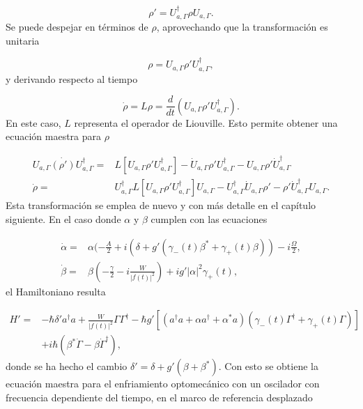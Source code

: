 \documentclass[10pt,a4paper]{report}
\begin{document}
\begin{equation}
\rho' = U_{a,\Gamma}^\dagger \rho U_{a,\Gamma}.
\end{equation} Se puede despejar en términos de $\rho$, aprovechando que la transformación es unitaria

\begin{equation}
\rho = U_{a,\Gamma} \rho' U_{a,\Gamma}^\dagger,
\end{equation} y derivando respecto al tiempo

\begin{equation}
\dot{\rho} = L\rho = \frac{d}{dt}(U_{a,\Gamma} \rho' U_{a,\Gamma}^\dagger).
\end{equation} En este caso, $L$ representa el operador de Liouville. Esto permite obtener una ecuación maestra para $\rho$

\begin{align}
 U_{a,\Gamma} \dot{(\rho')} U_{a,\Gamma}^\dagger =& L[U_{a,\Gamma} \rho' U_{a,\Gamma}^\dagger] - \dot{U}_{a,\Gamma}\rho'U_{a,\Gamma}^\dagger -U_{a,\Gamma} \rho' \dot{U}_{a,\Gamma}^\dagger\\
\dot{\rho} =& U_{a,\Gamma}^\dagger L[U_{a,\Gamma} \rho' U_{a,\Gamma}^\dagger]U_{a,\Gamma}-U_{a,\Gamma}^\dagger\dot{U}_{a,\Gamma}\rho'-\rho'\dot{U}_{a,\Gamma}^\dagger U_{a,\Gamma}.
\end{align} Esta transformación se emplea de nuevo y con más detalle en el capítulo siguiente. En el caso donde $\alpha$ y $\beta$ cumplen con las ecuaciones

\begin{align}
\dot{\alpha} =& \alpha(-\frac{A}{2}+i(\delta+g'(\gamma_-(t) \beta^* + \gamma_+(t) \beta))-i\frac{\Omega}{2},\\
\dot{\beta} =& \beta(-\frac{\gamma}{2}-i\frac{W}{|f(t)|^2})+ig'|\alpha|^2\gamma_+(t),
\end{align} el Hamiltoniano resulta


\begin{align*}
H'=& -\hbar \delta' a^\dagger a + \frac{W}{|f(t)|^2}\Gamma \Gamma^\dagger -\hbar g'[(a^{\dagger}a +\alpha a^{\dagger}+\alpha^* a)(\gamma_-(t)\Gamma^{\dagger}+\gamma_+(t)\Gamma)]\\
&+ i\hbar(\beta^*\dot{\Gamma} - \beta \dot{\Gamma}^\dagger),
\end{align*}  donde se ha hecho el cambio $\delta' = \delta + g'(\beta + \beta^*)$. Con esto se obtiene la ecuación maestra para el enfriamiento optomecánico con un oscilador con frecuencia dependiente del tiempo, en el marco de referencia desplazado
\end{document}
